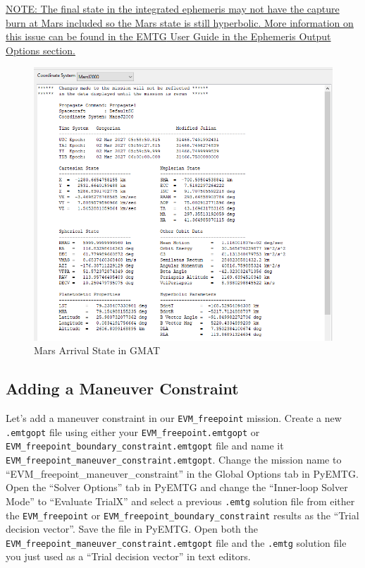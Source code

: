 \documentclass[11pt]{article}
\makeatletter
\newcommand{\knownissuelabel}[2]
{
	 \phantomsection
  	\hyperref[#2_h]{#1}\def\@currentlabel{\unexpanded{#1}}\label{#2_b}
}
\makeatother
\begin{document}
\noindent\knownissuelabel{NOTE: The final state in the integrated ephemeris may not have the capture burn at Mars included so the Mars state is still hyperbolic. More information on this issue can be found in the \ac{EMTG} User Guide in the Ephemeris Output Options section.}{missing_capture_burn_issue}

\begin{figure}[H]
	\centering
	\includegraphics[width=0.95\linewidth]{Constraint_Scripting_mars_gmat_arrival.png}
	\caption{Mars Arrival State in \ac{GMAT}}
\end{figure}

\subsection{Adding a Maneuver Constraint}
\label{sec:adding_a_maneuver_constraint}

Let's add a maneuver constraint in our \verb|EVM_freepoint| mission. Create a new \verb|.emtgopt| file using either your \verb|EVM_freepoint.emtgopt| or \verb|EVM_freepoint_boundary_constraint.emtgopt| file and name it \verb|EVM_freepoint_maneuver_constraint.emtgopt|. Change the mission name to \newline``EVM\_freepoint\_maneuver\_constraint'' in the Global Options tab in PyEMTG. Open the ``Solver Options'' tab in PyEMTG and change the ``Inner-loop Solver Mode'' to ``Evaluate TrialX'' and select a previous \verb|.emtg| solution file from either the \verb|EVM_freepoint| or \verb|EVM_freepoint_boundary_constraint| results as the ``Trial decision vector''. Save the file in PyEMTG. Open both the \newline\verb|EVM_freepoint_maneuver_constraint.emtgopt| file and the \verb|.emtg| solution file you just used as a ``Trial decision vector'' in text editors.
\end{document}
